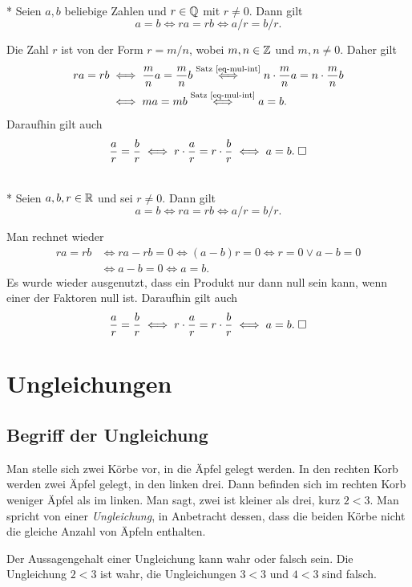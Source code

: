 \begin{Satz}[Äquivalenzumformungen]\mbox{}\\*
Seien $a,b$ beliebige Zahlen und $r\in\mathbb Q$ mit $r\ne 0$. Dann gilt
\[a=b\iff ra=rb\iff a/r=b/r.\]
\end{Satz}
Die Zahl $r$ ist von der Form $r=m/n$, wobei $m,n\in\mathbb Z$ und $m,n\ne 0$.
Daher gilt
\begin{align*}
ra=rb&\iff \frac{m}{n}a=\frac{m}{n}b
\stackrel{\text{Satz \ref{eq-mul-int}}}\iff n\cdot\frac{m}{n}a=n\cdot\frac{m}{n}b\\
&\iff ma=mb\stackrel{\text{Satz \ref{eq-mul-int}}}\iff a=b.
\end{align*}
Daraufhin gilt auch
\[\frac{a}{r}=\frac{b}{r}\iff r\cdot\frac{a}{r}=r\cdot\frac{b}{r}
\iff a=b.\;\Box\]

\begin{Satz}[Äquivalenzumformungen]\mbox{}\\*
Seien $a,b,r\in\mathbb R$ und sei $r\ne 0$. Dann gilt
\[a=b\iff ra=rb\iff a/r=b/r.\]
\end{Satz}
 Man rechnet wieder
\begin{align*}
ra = rb&\iff ra-rb=0\iff (a-b)r=0\iff r=0\lor a-b=0\\
&\iff a-b=0\iff a=b.
\end{align*}
Es wurde wieder ausgenutzt, dass ein Produkt nur dann null sein
kann, wenn einer der Faktoren null ist. Daraufhin gilt auch
\[\frac{a}{r}=\frac{b}{r}\iff r\cdot\frac{a}{r}=r\cdot\frac{b}{r}
\iff a=b.\;\Box\]

\noindent


\newpage
\section{Ungleichungen}

\subsection{Begriff der Ungleichung}%

Man stelle sich zwei Körbe vor, in die Äpfel gelegt werden.
In den rechten Korb werden zwei Äpfel gelegt, in den linken drei.
Dann befinden sich im rechten Korb weniger Äpfel als im linken.
Man sagt, zwei ist kleiner als drei, kurz $2<3$. Man spricht von
einer \emph{Ungleichung}, in Anbetracht dessen, dass die beiden
Körbe nicht die gleiche Anzahl von Äpfeln enthalten.

Der Aussagengehalt einer Ungleichung kann wahr oder falsch sein.
Die Ungleichung $2<3$ ist wahr, die Ungleichungen $3<3$ und
$4<3$ sind falsch.

